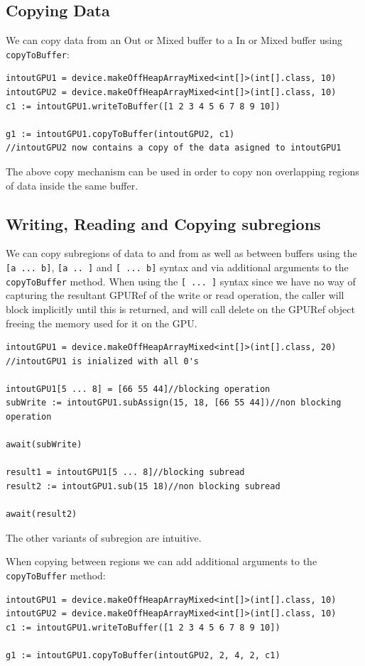 \documentclass[conc-doc]{subfiles}
\begin{document}
\subsection{Copying Data}
We can copy data from an Out or Mixed buffer to a In or Mixed buffer using \lstinline{copyToBuffer}:
\begin{lstlisting}
intoutGPU1 = device.makeOffHeapArrayMixed<int[]>(int[].class, 10)
intoutGPU2 = device.makeOffHeapArrayMixed<int[]>(int[].class, 10)
c1 := intoutGPU1.writeToBuffer([1 2 3 4 5 6 7 8 9 10])

g1 := intoutGPU1.copyToBuffer(intoutGPU2, c1)
//intoutGPU2 now contains a copy of the data asigned to intoutGPU1
\end{lstlisting}

The above copy mechanism can be used in order to copy non overlapping regions of data inside the same buffer.

\subsection{Writing, Reading and Copying subregions}
We can copy subregions of data to and from as well as between buffers using the \lstinline{[a ... b]}, \lstinline{[a .. ]} and \lstinline{[ ... b]} syntax and via additional arguments to the \lstinline{copyToBuffer} method. When using the \lstinline{[ ... ]} syntax since we have no way of capturing the resultant GPURef of the write or read operation, the caller will block implicitly until this is returned, and will call delete on the GPURef object freeing the memory used for it on the GPU.

\begin{lstlisting}
intoutGPU1 = device.makeOffHeapArrayMixed<int[]>(int[].class, 20)
//intoutGPU1 is inialized with all 0's

intoutGPU1[5 ... 8] = [66 55 44]//blocking operation
subWrite := intoutGPU1.subAssign(15, 18, [66 55 44])//non blocking operation

await(subWrite)

result1 = intoutGPU1[5 ... 8]//blocking subread
result2 := intoutGPU1.sub(15 18)//non blocking subread

await(result2)
\end{lstlisting}

The other variants of subregion are intuitive.

When copying between regions we can add additional arguments to the \lstinline{copyToBuffer} method:
\begin{lstlisting}
intoutGPU1 = device.makeOffHeapArrayMixed<int[]>(int[].class, 10)
intoutGPU2 = device.makeOffHeapArrayMixed<int[]>(int[].class, 10)
c1 := intoutGPU1.writeToBuffer([1 2 3 4 5 6 7 8 9 10])

g1 := intoutGPU1.copyToBuffer(intoutGPU2, 2, 4, 2, c1)
\end{lstlisting}
\end{document}
